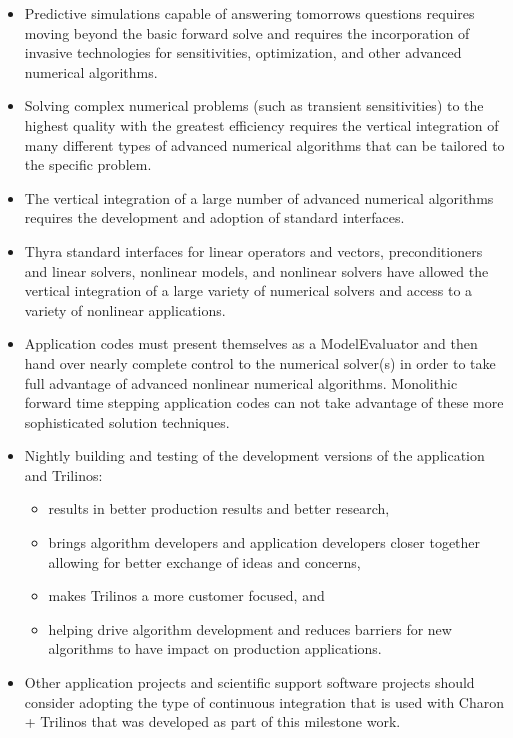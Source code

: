 \documentclass[pdf,ps2pdf,11pt]{SANDreport}
\begin{document}
\begin{itemize}

{}\item Predictive simulations capable of answering tomorrows questions
requires moving beyond the basic forward solve and requires the incorporation
of invasive technologies for sensitivities, optimization, and other advanced
numerical algorithms.

{}\item Solving complex numerical problems (such as transient sensitivities)
to the highest quality with the greatest efficiency requires the vertical
integration of many different types of advanced numerical algorithms that can
be tailored to the specific problem.

{}\item The vertical integration of a large number of advanced numerical
algorithms requires the development and adoption of standard interfaces.

{}\item Thyra standard interfaces for linear operators and vectors,
preconditioners and linear solvers, nonlinear models, and nonlinear solvers
have allowed the vertical integration of a large variety of numerical solvers
and access to a variety of nonlinear applications.

{}\item Application codes must present themselves as a ModelEvaluator and then
hand over nearly complete control to the numerical solver(s) in order to take
full advantage of advanced nonlinear numerical algorithms.  Monolithic forward
time stepping application codes can not take advantage of these more
sophisticated solution techniques.

{}\item Nightly building and testing of the development versions of the
application and Trilinos:

  \begin{itemize}

  {}\item results in better production results and better research,

  {}\item brings algorithm developers and application developers closer
  together allowing for better exchange of ideas and concerns,

  {}\item makes Trilinos a more customer focused, and

  {}\item helping drive algorithm development and reduces barriers for new
  algorithms to have impact on production applications.

  \end{itemize}

{}\item Other application projects and scientific support software projects
should consider adopting the type of continuous integration that is used with
Charon + Trilinos that was developed as part of this milestone work.

\end{itemize}
\end{document}
